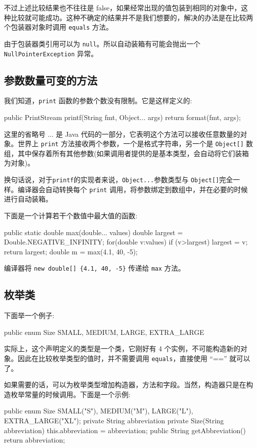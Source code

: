 不过上述比较结果也不往往是 false，如果经常出现的值包装到相同的对象中，这种比较就可能成功。这种不确定的结果并不是我们想要的，解决的办法是在比较两个包装器对象时调用 \texttt{equals} 方法。

由于包装器类引用可以为 \texttt{null}。所以自动装箱有可能会抛出一个 \texttt{NullPointerException} 异常。

\subsection{参数数量可变的方法}

我们知道，\texttt{print} 函数的参数个数没有限制。它是这样定义的:
\begin{Java}
public PrintStream printf(String fmt, Object... args) {
    return format(fmt, args);
}
\end{Java}

这里的省略号 ... 是 Java 代码的一部分，它表明这个方法可以接收任意数量的对象。世界上 \texttt{print} 方法接收两个参数，一个是格式字符串，另一个是 \texttt{Object[]} 数组，其中保存着所有其他参数(如果调用者提供的是基本类型，会自动将它们装箱为对象)。

换句话说，对于\texttt{printf}的实现者来说，\texttt{Object...}参数类型与 \texttt{Object[]}完全一样。编译器会自动转换每个 \texttt{print} 调用，将参数绑定到数组中，并在必要的时候进行自动装箱。

下面是一个计算若干个数值中最大值的函数:
\begin{Java}
public static double max(double... values) {
    double largest = Double.NEGATIVE_INFINITY;
    for(double v:values)
        if (v>largest)
            largest = v;
    return largest;
}
double m = max(4.1, 40, -5);
\end{Java}

编译器将 \texttt{new double[] \{4.1, 40, -5\}} 传递给 \texttt{max} 方法。

\subsection{枚举类}

下面举一个例子:
\begin{Java}
public enum Size {SMALL, MEDIUM, LARGE, EXTRA_LARGE}
\end{Java}
实际上，这个声明定义的类型是一个类，它刚好有 4 个实例，不可能构造新的对象。因此在比较枚举类型的值时，并不需要调用 \texttt{equals}，直接使用 ``=='' 就可以了。

如果需要的话，可以为枚举类型增加构造器，方法和字段。当然，构造器只是在构造枚举常量的时候调用。下面是一个示例:
\begin{Java}
public enum Size {
    SMALL("S"), MEDIUM("M"), LARGE("L"), EXTRA_LARGE("XL");
    private String abbreviation
    private Size(String abbreviation) {this.abbreviation = abbreviation;}
    public String getAbbreviation() {return abbreviation;}
}
\end{Java}

